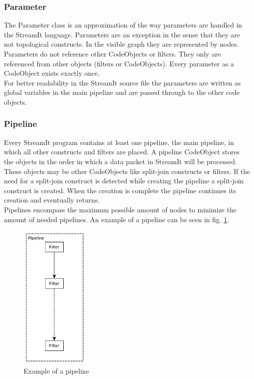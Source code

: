 \documentclass[journal]{IEEEtran}
\begin{document}
\subsubsection{Parameter}
\noindent The Parameter class is an approximation of the way parameters are
handled in the StreamIt language. Parameters are an exception in the sense that
they are not topological constructs. In the visible graph they are represented
by nodes. Parameters do not reference other CodeObjects or filters. They only
are referenced from other objects (filters or CodeObjects). Every parameter as a
CodeObject exists exactly once.\\
For better readability in the StreamIt source file the parameters are written as
global variables in the main pipeline and are passed through to the other code
objects.\\


\subsubsection{Pipeline}
\noindent Every StreamIt program contains at least one pipeline, the main
pipeline, in which all other constructs and filters are placed. A pipeline 
CodeObject stores the objects in the order in which a data packet in StreamIt 
will be processed. These objects may be other CodeObjects like split-join 
constructs or filters. If the need for a split-join construct is detected 
while creating the pipeline a split-join construct is created. When the 
creation is complete the pipeline continues its creation and eventually 
returns.\\
Pipelines encompass the maximum possible amount of nodes to minimize the 
amount of needed pipelines. An example of a pipeline can be seen in fig. 
\ref{fig_Pipeline}.

\begin{figure}[h]
	\centering
	\includegraphics[width=0.3\textwidth]{PipelineGraphic}
	\caption{Example of a pipeline}
	\label{fig_Pipeline}
\end{figure}
\end{document}
